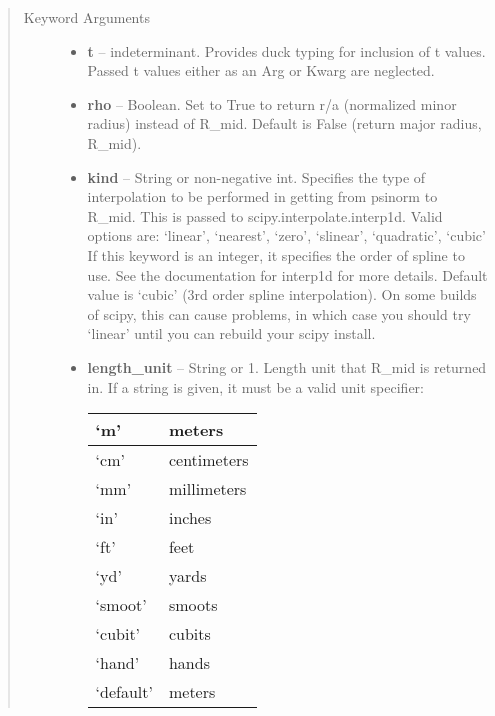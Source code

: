 \documentclass[letterpaper,10pt,english]{sphinxmanual}
\begin{document}
\begin{fulllineitems}
\begin{fulllineitems}
\begin{quote}
\begin{description}
\item[{Keyword Arguments}] \leavevmode\begin{itemize}
\item {} 
\textbf{t} --
indeterminant.
Provides duck typing for inclusion of t values. Passed t values
either as an Arg or Kwarg are neglected.

\item {} 
\textbf{rho} --
Boolean.
Set to True to return r/a (normalized minor radius)
instead of R\_mid. Default is False (return major radius, R\_mid).

\item {} 
\textbf{kind} --
String or non-negative int.
Specifies the type of interpolation
to be performed in getting from psinorm to R\_mid. This is
passed to scipy.interpolate.interp1d. Valid options are:
`linear', `nearest', `zero', `slinear', `quadratic', `cubic'
If this keyword is an integer, it specifies the order of spline
to use. See the documentation for interp1d for more details.
Default value is `cubic' (3rd order spline interpolation). On
some builds of scipy, this can cause problems, in which case
you should try `linear' until you can rebuild your scipy install.

\item {} 
\textbf{length\_unit} --
String or 1.
Length unit that R\_mid is returned in. If
a string is given, it must be a valid unit specifier:

\begin{tabulary}{\linewidth}{|L|L|}
\hline

`m'
 & 
meters
\\\hline

`cm'
 & 
centimeters
\\\hline

`mm'
 & 
millimeters
\\\hline

`in'
 & 
inches
\\\hline

`ft'
 & 
feet
\\\hline

`yd'
 & 
yards
\\\hline

`smoot'
 & 
smoots
\\\hline

`cubit'
 & 
cubits
\\\hline

`hand'
 & 
hands
\\\hline

`default'
 & 
meters
\\\hline
\end{tabulary}



\end{itemize}
\end{description}
\end{quote}
\end{fulllineitems}
\end{fulllineitems}
\end{document}
